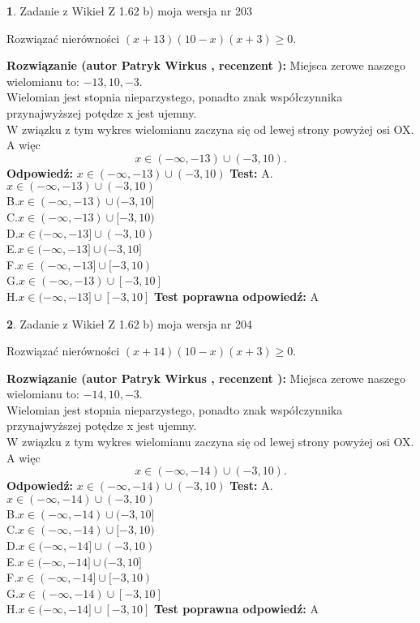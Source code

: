 \documentclass[12pt, a4paper]{article}
\theoremstyle{definition} %
\newtheorem{zad}{}
\newcommand{\zadStart}[1]{\begin{zad}#1\newline}
\newcommand{\zadStop}{\end{zad}}
\newcommand{\rozwStart}[2]{\noindent \textbf{Rozwiązanie (autor #1 , recenzent #2): }\newline}
\newcommand{\rozwStop}{\newline}
\newcommand{\odpStart}{\noindent \textbf{Odpowiedź:}\newline}
\newcommand{\odpStop}{\newline}
\newcommand{\testStart}{\noindent \textbf{Test:}\newline}
\newcommand{\testStop}{\newline}
\newcommand{\kluczStart}{\noindent \textbf{Test poprawna odpowiedź:}\newline}
\newcommand{\kluczStop}{\newline}
\begin{document}
\zadStart{Zadanie z Wikieł Z 1.62 b) moja wersja nr 203}

Rozwiązać nierówności $(x+13)(10-x)(x+3)\ge0$.
\zadStop
\rozwStart{Patryk Wirkus}{}
Miejsca zerowe naszego wielomianu to: $-13, 10, -3$.\\
Wielomian jest stopnia nieparzystego, ponadto znak współczynnika przy\linebreak najwyższej potędze x jest ujemny.\\ W związku z tym wykres wielomianu zaczyna się od lewej strony powyżej osi OX. A więc $$x \in (-\infty,-13) \cup (-3,10).$$
\rozwStop
\odpStart
$x \in (-\infty,-13) \cup (-3,10)$
\odpStop
\testStart
A.$x \in (-\infty,-13) \cup (-3,10)$\\
B.$x \in (-\infty,-13) \cup (-3,10]$\\
C.$x \in (-\infty,-13) \cup [-3,10)$\\
D.$x \in (-\infty,-13] \cup (-3,10)$\\
E.$x \in (-\infty,-13] \cup (-3,10]$\\
F.$x \in (-\infty,-13] \cup [-3,10)$\\
G.$x \in (-\infty,-13) \cup [-3,10]$\\
H.$x \in (-\infty,-13] \cup [-3,10]$
\testStop
\kluczStart
A
\kluczStop



\zadStart{Zadanie z Wikieł Z 1.62 b) moja wersja nr 204}

Rozwiązać nierówności $(x+14)(10-x)(x+3)\ge0$.
\zadStop
\rozwStart{Patryk Wirkus}{}
Miejsca zerowe naszego wielomianu to: $-14, 10, -3$.\\
Wielomian jest stopnia nieparzystego, ponadto znak współczynnika przy\linebreak najwyższej potędze x jest ujemny.\\ W związku z tym wykres wielomianu zaczyna się od lewej strony powyżej osi OX. A więc $$x \in (-\infty,-14) \cup (-3,10).$$
\rozwStop
\odpStart
$x \in (-\infty,-14) \cup (-3,10)$
\odpStop
\testStart
A.$x \in (-\infty,-14) \cup (-3,10)$\\
B.$x \in (-\infty,-14) \cup (-3,10]$\\
C.$x \in (-\infty,-14) \cup [-3,10)$\\
D.$x \in (-\infty,-14] \cup (-3,10)$\\
E.$x \in (-\infty,-14] \cup (-3,10]$\\
F.$x \in (-\infty,-14] \cup [-3,10)$\\
G.$x \in (-\infty,-14) \cup [-3,10]$\\
H.$x \in (-\infty,-14] \cup [-3,10]$
\testStop
\kluczStart
A
\kluczStop
\end{document}
